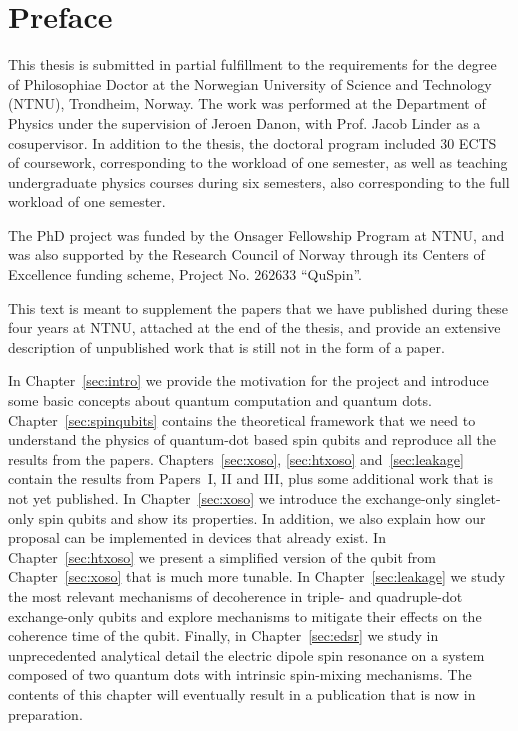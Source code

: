 
\chapter*{Preface\label{sec:pre}}

This thesis is submitted in partial fulfillment to the requirements for the degree of Philosophiae Doctor at the Norwegian University of Science and Technology (NTNU), Trondheim, Norway. The work was performed at the Department of Physics under the supervision of Jeroen Danon, with Prof. Jacob Linder as a cosupervisor.
In addition to the thesis, the doctoral program included 30 ECTS of coursework, corresponding to the workload of one semester, as well as teaching undergraduate physics courses during six semesters, also corresponding to the full workload of one semester.

The PhD project was funded by the Onsager Fellowship Program at NTNU, and was also supported by the Research Council of Norway through its Centers of Excellence funding scheme, Project No. 262633 ``QuSpin''.

This text is meant to supplement the papers that we have published during these four years at NTNU, attached at the end of the thesis, and provide an extensive description of unpublished work that is still not in the form of a paper.

In Chapter~\ref{sec:intro} we provide the motivation for the project and introduce some basic concepts about quantum computation and quantum dots. Chapter~\ref{sec:spinqubits} contains the theoretical framework that we need to understand the physics of quantum-dot based spin qubits and reproduce all the results from the papers.
%
Chapters~\ref{sec:xoso}, \ref{sec:htxoso} and~\ref{sec:leakage} contain the results from Papers~I, II and III, plus some additional work that is not yet published. In Chapter~\ref{sec:xoso} we introduce the exchange-only singlet-only spin qubits and show its properties. In addition, we also explain how our proposal can be implemented in devices that already exist.  In Chapter~\ref{sec:htxoso} we present a simplified version of the qubit from Chapter~\ref{sec:xoso} that is much more tunable. In Chapter~\ref{sec:leakage} we study the most relevant mechanisms of decoherence in triple- and quadruple-dot exchange-only qubits and explore mechanisms to mitigate their effects on the coherence time of the qubit.
%
Finally, in Chapter~\ref{sec:edsr} we study in unprecedented analytical detail the electric dipole spin resonance on a system composed of two quantum dots with intrinsic spin-mixing mechanisms. The contents of this chapter will eventually result in a publication that is now in preparation.
